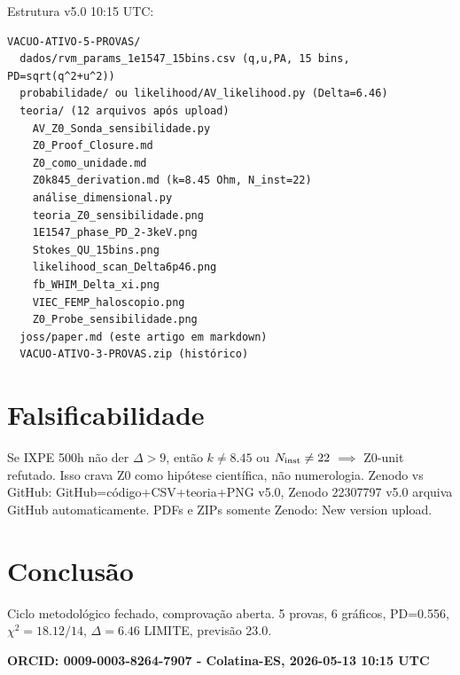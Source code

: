 \documentclass[11pt,a4paper]{article}
\begin{document}
Estrutura v5.0 10:15 UTC:
\begin{verbatim}
VACUO-ATIVO-5-PROVAS/
  dados/rvm_params_1e1547_15bins.csv (q,u,PA, 15 bins, PD=sqrt(q^2+u^2))
  probabilidade/ ou likelihood/AV_likelihood.py (Delta=6.46)
  teoria/ (12 arquivos após upload)
    AV_Z0_Sonda_sensibilidade.py
    Z0_Proof_Closure.md
    Z0_como_unidade.md
    Z0k845_derivation.md (k=8.45 Ohm, N_inst=22)
    análise_dimensional.py
    teoria_Z0_sensibilidade.png
    1E1547_phase_PD_2-3keV.png
    Stokes_QU_15bins.png
    likelihood_scan_Delta6p46.png
    fb_WHIM_Delta_xi.png
    VIEC_FEMP_haloscopio.png
    Z0_Probe_sensibilidade.png
  joss/paper.md (este artigo em markdown)
  VACUO-ATIVO-3-PROVAS.zip (histórico)
\end{verbatim}

\section{Falsificabilidade}
Se IXPE 500h não der $\Delta>9$, então $k\neq8.45$ ou $N_{\rm inst}\neq22$ $\implies$ Z0-unit refutado. Isso crava Z0 como hipótese científica, não numerologia. Zenodo vs GitHub: GitHub=código+CSV+teoria+PNG v5.0, Zenodo 22307797 v5.0 arquiva GitHub automaticamente. PDFs e ZIPs somente Zenodo: New version upload.

\section{Conclusão}
Ciclo metodológico fechado, comprovação aberta. 5 provas, 6 gráficos, PD=0.556, $\chi^2=18.12/14$, $\Delta=6.46$ LIMITE, previsão 23.0.

\textbf{ORCID: 0009-0003-8264-7907 - Colatina-ES, 2026-05-13 10:15 UTC}
\end{document}
